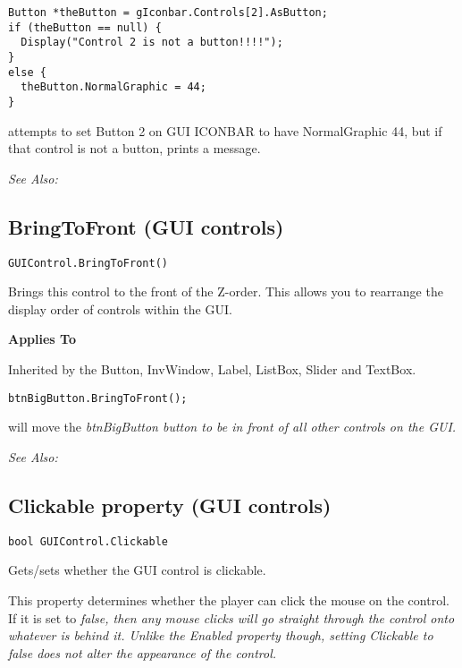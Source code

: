 \begin{verbatim}
Button *theButton = gIconbar.Controls[2].AsButton;
if (theButton == null) {
  Display("Control 2 is not a button!!!!");
}
else {
  theButton.NormalGraphic = 44;
}
\end{verbatim}
attempts to set Button 2 on GUI ICONBAR to have NormalGraphic 44, but if that
control is not a button, prints a message.

\it{See Also:} 


\subsection{BringToFront (GUI controls)}\label{GUIControl.BringToFront}%

\begin{verbatim}
GUIControl.BringToFront()
\end{verbatim}
Brings this control to the front of the Z-order. This allows you to rearrange the display order
of controls within the GUI.

\bf{Applies To}

Inherited by the Button, InvWindow, Label, ListBox, Slider and TextBox.

\begin{verbatim}
btnBigButton.BringToFront();
\end{verbatim}
will move the \it{btnBigButton} button to be in front of all other controls on the GUI.

\it{See Also:} 


\subsection{Clickable property (GUI controls)}\label{GUIControl.Clickable}%

\begin{verbatim}
bool GUIControl.Clickable
\end{verbatim}
Gets/sets whether the GUI control is clickable.

This property determines whether the player can click the mouse on the control. If it is set to \it{false},
then any mouse clicks will go straight through the control onto whatever is behind it. Unlike the Enabled
property though, setting Clickable to false does not alter the appearance of the control.

